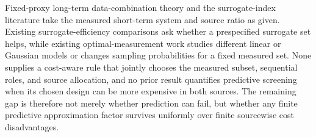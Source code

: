 Fixed-proxy long-term data-combination theory and the surrogate-index literature take the measured short-term system and source ratio as given. Existing surrogate-efficiency comparisons ask whether a prespecified surrogate set helps, while existing optimal-measurement work studies different linear or Gaussian models or changes sampling probabilities for a fixed measured set. None supplies a cost-aware rule that jointly chooses the measured subset, sequential roles, and source allocation, and no prior result quantifies predictive screening when its chosen design can be more expensive in both sources. The remaining gap is therefore not merely whether prediction can fail, but whether any finite predictive approximation factor survives uniformly over finite sourcewise cost disadvantages.